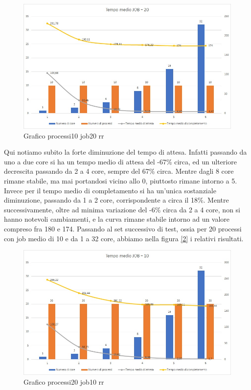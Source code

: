 \documentclass[Lau, oneside]{sapthesis}%
\begin{document}
\begin{figure}[ht!]
  \centering
  \includegraphics[width=1\textwidth]{Grafico processi10 job20 rr.jpg}
  \caption{Grafico processi10 job20 rr}
  \label{figura:p10j20rr}
\end{figure}
Qui notiamo subito la forte diminuzione del tempo di attesa.
Infatti passando da uno a due core si ha un tempo medio di attesa del -67\% circa, ed un ulteriore decrescita passando da 2 a 4 core, sempre del 67\% circa.
Mentre dagli 8 core rimane stabile, ma mai portandosi vicino allo 0, piuttosto rimane intorno a 5.
Invece per il tempo medio di completamento si ha un'unica sostanziale diminuzione, passando da 1 a 2 core, corrispondente a circa il 18\%.
Mentre successivamente, oltre ad minima variazione del -6\% circa da 2 a 4 core, non si hanno notevoli cambiamenti, e la curva rimane stabile intorno ad un valore compreso fra 180 e 174.
Passando al set successivo di test, ossia per 20 processi con job medio di 10 e da 1 a 32 core, abbiamo nella figura \hyperref[figura:p20j10rr]{[\ref*{figura:p20j10rr}]} i relativi risultati.
\begin{figure}[ht!]
  \centering
  \includegraphics[width=1\textwidth]{Grafico processi20 job10 rr.jpg}
  \caption{Grafico processi20 job10 rr}
  \label{figura:p20j10rr}
\end{figure}
\end{document}
